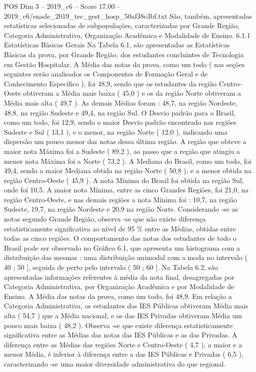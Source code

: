 \begin{textsample}{POS Dim 3 – 2019\_c6 – Score 17.00 – 2019\_c6/enade\_2019\_tec\_gest\_hosp\_50af38c3bf.txt}
São, também, apresentadas estatísticas selecionadas de subpopulações, caracterizadas por Grande Região, Categoria Administrativa, Organização Acadêmica e Modalidade de Ensino. 6.1.1 Estatísticas Básicas Gerais Na Tabela 6.1, são apresentadas as Estatísticas Básicas da prova, por Grande Região, dos estudantes concluintes de Tecnologia em Gestão Hospitalar.
A Média das notas da prova, como um todo ( nas seções seguintes serão analisados os Componentes de Formação Geral e de Conhecimento Específico ), foi 48,9, sendo que os estudantes da região Centro-Oeste obtiveram a Média mais baixa ( 45,0 ) e os da região Norte obtiveram a Média mais alta ( 49,7 ).
As demais Médias foram : 48,7, na região Nordeste, 48,8, na região Sudeste e 49,4, na região Sul.
O Desvio padrão para o Brasil, como um todo, foi 12,9, sendo o maior Desvio padrão encontrado nas regiões Sudeste e Sul ( 13,1 ), e o menor, na região Norte ( 12,0 ), indicando uma dispersão um pouco menor das notas dessa última região.
A região que obteve a maior nota Máxima foi a Sudeste ( 89,2 ), ao passo que a região que atingiu a menor nota Máxima foi a Norte ( 73,2 ).
A Mediana do Brasil, como um todo, foi 49,4, sendo a maior Mediana obtida na região Norte ( 50,8 ), e a menor obtida na região Centro-Oeste ( 45,9 ).
A nota Mínima do Brasil foi obtida na região Sul, onde foi 10,5.
A maior nota Mínima, entre as cinco Grandes Regiões, foi 21,0, na região Centro-Oeste, e nas demais regiões a nota Mínima foi : 10,7, na região Sudeste, 19,7, na região Nordeste e 20,9 na região Norte.
Considerando -se as notas segundo Grande Região, observa -se que não existe diferença estatisticamente significativa ao nível de 95 \% entre as Médias, obtidas entre todas as cinco regiões.
O comportamento das notas dos estudantes de todo o Brasil pode ser observado no Gráfico 6.1, que apresenta um histograma com a distribuição das mesmas : uma distribuição unimodal com a moda no intervalo ( 40 ; 50 ], seguida de perto pelo intervalo ( 50 ; 60 ].
Na Tabela 6.2, são apresentadas informações referentes à média da nota final, desagregadas por Categoria Administrativa, por Organização Acadêmica e por Modalidade de Ensino.
A Média das notas da prova, como um todo, foi 48,9.
Em relação a Categoria Administrativa, os estudantes das IES Públicas obtiveram Média mais alta ( 54,7 ) que a Média nacional, e os das IES Privadas obtiveram Média um pouco mais baixa ( 48,2 ).
Observa -se que existe diferença estatisticamente significativa entre as Médias das notas das IES Públicas e as das Privadas.
A diferença entre as Médias das regiões Norte e Centro-Oeste ( 4,7 ), a maior e a menor Média, é inferior à diferença entre a das IES Públicas e Privadas ( 6,5 ), caracterizando -se uma maior diversidade administrativa do que regional.

\end{textsample}
